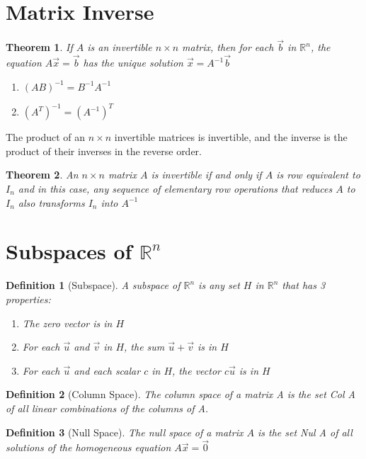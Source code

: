 \documentclass[oneside]{report}
\newtheorem{theorem}{Theorem}[section]
\newtheorem{definition}{Definition}[section]
\begin{document}
\section{Matrix Inverse}
\begin{theorem}
  If $A$ is an invertible $n \times n$ matrix, then for each $\vec{b}$ in $\mathbb{R}^n$, the equation $A\vec{x} = \vec{b}$ has the unique solution $\vec{x} = A^{-1} \vec{b}$
\end{theorem}

\begin{enumerate}
  \item $(AB)^{-1} = B^{-1}A^{-1}$
  \item $(A^T)^{-1} = (A^{-1})^T$
\end{enumerate}

The product of an $n \times n$ invertible matrices is invertible, and the inverse is the
product of their inverses in the reverse order.

\begin{theorem}
  An $n \times n$ matrix $A$ is invertible if and only if $A$ is row equivalent to $I_n$ and in
this case, any sequence of elementary row operations that reduces $A$ to $I_n$ also transforms $I_n$ into $A^{-1}$
\end{theorem}

\section{Subspaces of $\mathbb{R}^n$}

\begin{definition}[Subspace]
  A subspace of $\mathbb{R}^n$ is any set $H$ in $\mathbb{R}^n$ that has 3 properties:
  \begin{enumerate}
    \item The zero vector is in $H$
    \item For each $\vec{u}$ and $\vec{v}$ in $H$, the sum $\vec{u} + \vec{v}$ is in $H$
    \item For each $\vec{u}$ and each scalar $c$ in $H$, the vector $c\vec{u}$ is in $H$
  \end{enumerate}
\end{definition}

\begin{definition} [Column Space]
 The column space of a matrix A is the set Col A of all linear combinations of the columns of A.
\end{definition}

\begin{definition} [Null Space]
  The null space of a matrix $A$ is the set Nul A of all solutions of the homogeneous
equation $A\vec{x} = \vec{0}$
\end{definition}
\end{document}
